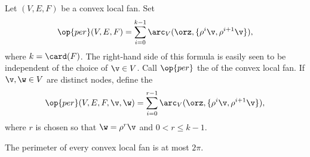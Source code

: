 \begin{definition}[perimeter]\label{lemma:perim}
Let $(V,E,F)$ be a convex local fan.    Set
\begin{displaymath}
  \op{per}(V,E,F) 
= \sum_{i=0}^{k-1} \arc_V(\orz,\{\rho^i \v,\rho^{i+1} \v\}), 
\end{displaymath}
where $k=\card(F)$.  The right-hand side of this formula is easily
seen to be independent of the choice of $\v\in V$.  Call $\op{per}$
the  of the convex local fan.  If $\v,\w\in V$ are
distinct nodes, define the 
\begin{displaymath}
  \op{per}(V,E,F,\v,\w) 
= \sum_{i=0}^{r-1} \arc_V(\orz,\{\rho^i \v,\rho^{i+1} \v\}), 
\end{displaymath}
where $r$ is chosen so that $\w=\rho^r \v$ and $0<r\le k-1$.
\end{definition}
%
%
%



\begin{lemma}
\label{lemma:convex-hyp}
The perimeter of every convex local fan is at most $2\pi$.  
\end{lemma}
%
%

